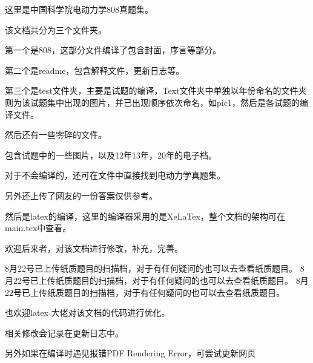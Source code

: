 这里是中国科学院电动力学808真题集。

该文档共分为三个文件夹。

第一个是808，这部分文件编译了包含封面，序言等部分。

第二个是readme，包含解释文件，更新日志等。

第三个是test文件夹，主要是试题的编译，Text文件夹中单独以年份命名的文件夹则为该试题集中出现的图片，并已出现顺序依次命名，如pic1，然后是各试题的编译文件。

然后还有一些零碎的文件。

包含试题中的一些图片，以及12年13年，20年的电子档。

对于不会编译的，还可在文件中直接找到电动力学真题集。

另外还上传了网友的一份答案仅供参考。

然后是latex的编译，这里的编译器采用的是XeLaTex，整个文档的架构可在main.tex中查看。

欢迎后来者，对该文档进行修改，补充，完善。

8月22号已上传纸质题目的扫描档，对于有任何疑问的也可以去查看纸质题目。
8月22号已上传纸质题目的扫描档，对于有任何疑问的也可以去查看纸质题目。
8月22号已上传纸质题目的扫描档，对于有任何疑问的也可以去查看纸质题目。

也欢迎latex 大佬对该文档的代码进行优化。

相关修改会记录在更新日志中。

另外如果在编译时遇见报错PDF Rendering Error，可尝试更新网页
